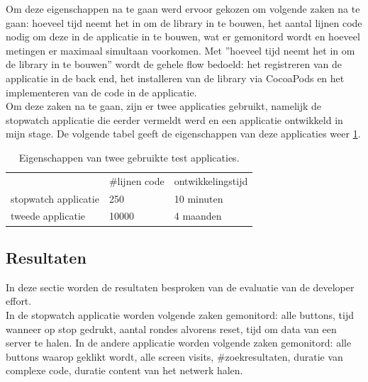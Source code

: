 Om deze eigenschappen na te gaan werd ervoor gekozen om volgende zaken na te gaan: hoeveel tijd neemt het in om de library in te bouwen, het aantal lijnen code nodig om deze in de applicatie in te bouwen, wat er gemonitord wordt en hoeveel metingen er maximaal simultaan voorkomen. Met ''hoeveel tijd neemt het in om de library in te bouwen''  wordt de gehele flow bedoeld: het registreren van de applicatie in de back end, het installeren van de library via CocoaPods en het implementeren van de code in de applicatie. \\

Om deze zaken na te gaan, zijn er twee applicaties gebruikt, namelijk de stopwatch applicatie die eerder vermeldt werd en een applicatie ontwikkeld in mijn stage. De volgende tabel geeft de eigenschappen van deze applicaties weer \ref{table:apps}.

\begin{table}[h]
\centering
\caption{Eigenschappen van twee gebruikte test applicaties.}
\label{table:apps}
\begin{tabular}{lll}
                     & \#lijnen code & ontwikkelingstijd \\
stopwatch applicatie & 250           & 10 minuten        \\
tweede applicatie    & 10000         & 4 maanden        
\end{tabular}
\end{table}

\subsection{Resultaten}
In deze sectie worden de resultaten besproken van de evaluatie van de developer effort.\\
In de stopwatch applicatie worden volgende zaken gemonitord: alle buttons, tijd wanneer op stop gedrukt, aantal rondes alvorens reset, tijd om data van een server te halen. In de andere applicatie worden volgende zaken gemonitord: alle buttons waarop geklikt wordt, alle screen visits, \#zoekresultaten, duratie van complexe code, duratie content van het netwerk halen.\\

